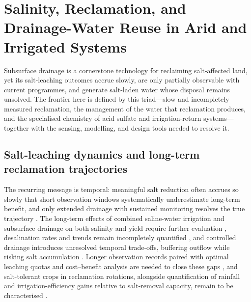 \section{Salinity, Reclamation, and Drainage-Water Reuse in Arid and Irrigated Systems}

Subsurface drainage is a cornerstone technology for reclaiming salt-affected
land, yet its salt-leaching outcomes accrue slowly, are only partially
observable with current programmes, and generate salt-laden water whose disposal
remains unsolved. The frontier here is defined by this triad---slow and
incompletely measured reclamation, the management of the water that reclamation
produces, and the specialised chemistry of acid sulfate and irrigation-return
systems---together with the sensing, modelling, and design tools needed to
resolve it.

\subsection{Salt-leaching dynamics and long-term reclamation trajectories}

The recurring message is temporal: meaningful salt reduction often accrues so
slowly that short observation windows systematically underestimate long-term
benefit, and only extended drainage with sustained monitoring resolves the true
trajectory \parencite{Almen2021,Daigh2025}. The long-term effects of combined
saline-water irrigation and subsurface drainage on both salinity and yield
require further evaluation \parencite{Feng2017,Feng2021}, desalination rates and
trends remain incompletely quantified \parencite{Guo2024b,Yao2024}, and
controlled drainage introduces unresolved temporal trade-offs, buffering
outflow while risking salt accumulation
\parencite{Jouni2018,Lu2019,Islam2025,Heng2021}. Longer observation records
paired with optimal leaching quotas and cost--benefit analysis are needed to
close these gaps \parencite{Guo2025}, and salt-tolerant crops in reclamation
rotations, alongside quantification of rainfall and irrigation-efficiency gains
relative to salt-removal capacity, remain to be characterised
\parencite{Qadir2001,Castanheira2010}.

